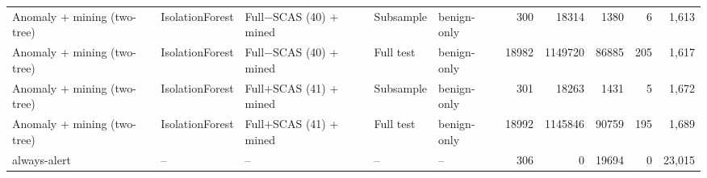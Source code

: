 \begin{longtable}{lllllrrrrr}
\addlinespace
Anomaly + mining (two-tree) & IsolationForest & Full$-$SCAS (40) + mined & Subsample & benign-only & 300 & 18314 & 1380 & 6 & 1,613 \\
\addlinespace
Anomaly + mining (two-tree) & IsolationForest & Full$-$SCAS (40) + mined & Full test & benign-only & 18982 & 1149720 & 86885 & 205 & 1,617 \\
\addlinespace
Anomaly + mining (two-tree) & IsolationForest & Full$+$SCAS (41) + mined & Subsample & benign-only & 301 & 18263 & 1431 & 5 & 1,672 \\
\addlinespace
Anomaly + mining (two-tree) & IsolationForest & Full$+$SCAS (41) + mined & Full test & benign-only & 18992 & 1145846 & 90759 & 195 & 1,689 \\
\midrule
always-alert & -- & -- & -- & -- & 306 & 0 & 19694 & 0 & 23,015 \\
\end{longtable}
